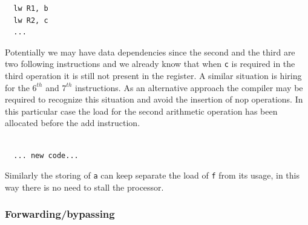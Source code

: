   \begin{verbatim}
  lw R1, b
  lw R2, c
  ...
  \end{verbatim}
  Potentially we may have data dependencies since the second and the third are two following instructions and we already know that when \verb|c| is required in the third operation it is still not present in the register. A similar situation is hiring for the $6^{th}$ and $7^{th}$ instructions. As an alternative approach the compiler may be required to recognize this situation and avoid the insertion of nop operations. In this particular case the load for the second arithmetic operation has been allocated before the add instruction.

  \begin{verbatim}

  ... new code...

  \end{verbatim}

  Similarly the storing of \verb|a| can keep separate the load of \verb|f| from its usage, in this way there is no need to stall the processor.

  \subsubsection{Forwarding/bypassing}


